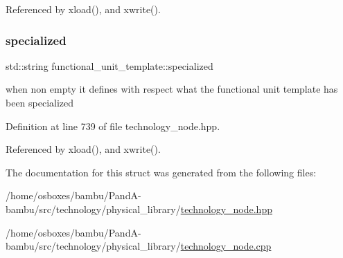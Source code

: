 Referenced by xload(), and xwrite().

\mbox{\label{structfunctional__unit__template_a9e15a301255ffcb69fb3ac2f519c6fb4}} 
\subsubsection{\texorpdfstring{specialized}{specialized}}
{\footnotesize\ttfamily std\+::string functional\+\_\+unit\+\_\+template\+::specialized}



when non empty it defines with respect what the functional unit template has been specialized 



Definition at line 739 of file technology\+\_\+node.\+hpp.



Referenced by xload(), and xwrite().



The documentation for this struct was generated from the following files\+:\begin{DoxyCompactItemize}
\item 
/home/osboxes/bambu/\+Pand\+A-\/bambu/src/technology/physical\+\_\+library/\hyperlink{technology__node_8hpp}{technology\+\_\+node.\+hpp}\item 
/home/osboxes/bambu/\+Pand\+A-\/bambu/src/technology/physical\+\_\+library/\hyperlink{technology__node_8cpp}{technology\+\_\+node.\+cpp}\end{DoxyCompactItemize}
